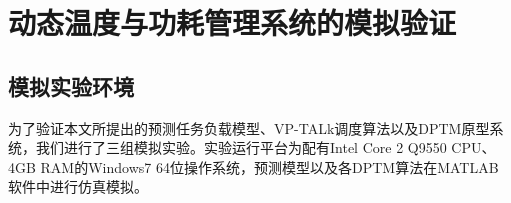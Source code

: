 


\chapter{动态温度与功耗管理系统的模拟验证}
\label{cha:DPTMexperiments}

\section{模拟实验环境}
为了验证本文所提出的预测任务负载模型、VP-TALk调度算法以及DPTM原型系统，我们进行了三组模拟实验。实验运行平台为配有Intel Core 2 Q9550 CPU、4GB RAM的Windows7 64位操作系统，预测模型以及各DPTM算法在MATLAB软件中进行仿真模拟。

